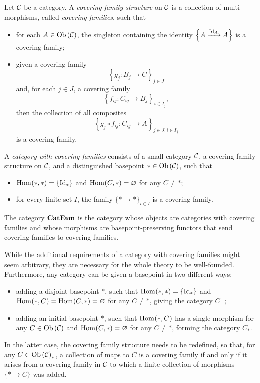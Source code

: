 \begin{definition}
    Let $\mathcal{C}$ be a category. A \emph{covering family structure} on $\mathcal{C}$ is a collection of multi-morphisms, called \emph{covering families}, such that
    \begin{itemize}
        \item for each $A \in \operatorname{Ob}{\lparen \mathcal{C} \rparen}$, the singleton containing the identity $\left\{ A \xrightarrow{\textnormal{Id}_{A}} A\right\}$ is a covering family;
        \item given a covering family
            \[ \left\{ g_j : B_j \to C \right\}_{j \in J} \]
            and, for each $j \in J$, a covering family
            \[ \left\{ f_{ij} : C_{ij} \to B_j \right\}_{i \in I_j},\]
            then the collection of all composites
            \[ \left\{ g_j \circ f_{ij} :  C_{ij}\to A \right\}_{j \in J, i \in I_j} \]
            is a covering family.
    \end{itemize}

    A \emph{category with covering families} consists of a small category $\mathcal{C}$, a covering family structure on $\mathcal{C}$, and a distinguished basepoint $* \in \operatorname{Ob}{\lparen \mathcal{C} \rparen}$, such that
    \begin{itemize}
        \item $\textnormal{Hom}_{ }\lparen{} * , * \rparen = \{\textnormal{Id}_{*}\}$ and $\textnormal{Hom}_{ }\lparen{} C , * \rparen = \varnothing$ for any $C \neq *$;
        \item for every finite set $I$, the family $\{* \to *\}_{i \in I}$ is a covering family.
    \end{itemize}

    The category $\textbf{CatFam}$ is the category whose objects are categories with covering families and whose morphisms are basepoint-preserving functors that send covering families to covering families.
\end{definition}

\begin{remark}
    While the additional requirements of a category with covering families might seem arbitrary, they are necessary for the whole theory to be well-founded. Furthermore, any category can be given a basepoint in two different ways:
    \begin{itemize}
        \item adding a disjoint basepoint $*$, such that $\textnormal{Hom}_{ }\lparen{} * , * \rparen = \{\textnormal{Id}_{*}\}$ and $\textnormal{Hom}_{ }\lparen{} * , C \rparen = \textnormal{Hom}_{ }\lparen{} C , * \rparen = \varnothing$ for any $C \neq *$, giving the category $C_+$;
        \item adding an initial basepoint $*$, such that $\textnormal{Hom}_{ }\lparen{} * , C \rparen$ has a single morphism for any $C \in \operatorname{Ob}{\lparen \mathcal{C} \rparen}$ and $\textnormal{Hom}_{ }\lparen{} C , * \rparen = \varnothing$ for any $C \neq *$, forming the category $C_*$.
    \end{itemize}
    In the latter case, the covering family structure needs to be redefined, so that, for any $C \in \operatorname{Ob}{\lparen \mathcal{C} \rparen}_*$, a collection of maps to $C$ is a covering family if and only if it arises from a covering family in $\mathcal{C}$ to which a finite collection of morphisms $\{ * \to C \}$ was added.
\end{remark}

